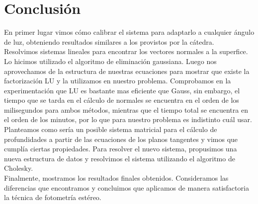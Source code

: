 \section{Conclusión}

En primer lugar vimos cómo calibrar el sistema para adaptarlo a cualquier ángulo de luz, obteniendo resultados similares a los provistos por la cátedra. \\

Resolvimos sistemas lineales para encontrar los vectores normales a la superfice. Lo hicimos utilizado el algoritmo de eliminación gaussiana. Luego nos aprovechamos de la estructura de nuestras ecuaciones para mostrar que existe la factorización LU y la utilizamos en nuestro problema. Comprobamos en la experimentación que LU es bastante mas eficiente que Gauss, sin embargo, el tiempo que se tarda en el cálculo de normales se encuentra en el orden de los milisegundos para ambos métodos, mientras que el tiempo total se encuentra en el orden de los minutos, por lo que para nuestro problema es indistinto cuál usar. \\

Planteamos como sería un posible sistema matricial para el cálculo de profundidades a partir de las ecuaciones de los planos tangentes y vimos que cumplía ciertas propiedades. Para resolver el nuevo sistema, propusimos una nueva estructura de datos y resolvimos el sistema utilizando el algoritmo de Cholesky. \\

Finalmente, mostramos los resultados finales obtenidos. Consideramos las diferencias que encontramos y concluimos que aplicamos de manera satisfactoria la técnica de fotometría estéreo. \\

